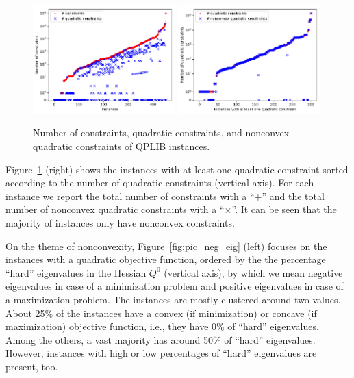 \begin{figure}\centering
  \includegraphics[width=0.49\textwidth]{pic_constr.pdf}
  \includegraphics[width=0.49\textwidth]{pic_quad_conv_vs_nonconv.pdf}
  \caption{Number of constraints, quadratic constraints, and nonconvex quadratic constraints of QPLIB instances. \label{fig:pic_constr}}
\end{figure}

Figure~\ref{fig:pic_constr} (right) shows the instances with at least one quadratic constraint sorted according to the number of quadratic constraints (vertical axis). For each instance we report the total number of constraints with a ``$+$''
and the total number of nonconvex quadratic constraints
with a ``$\times$''.
It can be seen that the majority of instances only have nonconvex constraints. %





On the theme of nonconvexity, Figure~\ref{fig:pic_neg_eig} (left) focuses on
the instances with a quadratic objective function, ordered by the
the percentage ``hard'' eigenvalues in the Hessian $Q^0$ (vertical axis), by which
we mean negative eigenvalues in case of a minimization problem and positive eigenvalues in case of a maximization problem.
The instances are mostly clustered around two values. About 25\% of the instances have a convex (if minimization) or concave (if maximization) objective function,
i.e., they have 0\% of ``hard'' eigenvalues. Among the others, a vast
majority has around 50\% of ``hard'' eigenvalues. However, instances
with high or low percentages of ``hard'' eigenvalues are present, too.

